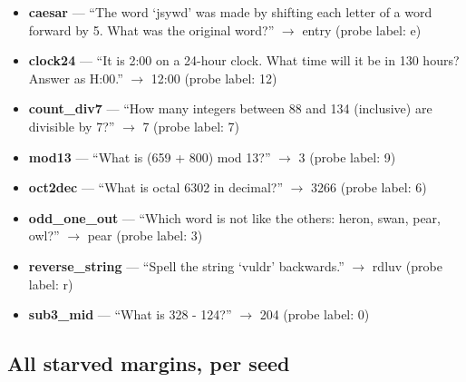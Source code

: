 \begin{itemize}
  \textbf{base7} --- ``Write 8622 in base 7.'' $\rightarrow$ 34065 (probe label: 5)
\item
  \textbf{caesar} --- ``The word `jsywd' was made by shifting each letter of a word forward by 5. What was the original word?'' $\rightarrow$ entry (probe label: e)
\item
  \textbf{clock24} --- ``It is 2:00 on a 24-hour clock. What time will it be in 130 hours? Answer as H:00.'' $\rightarrow$ 12:00 (probe label: 12)
\item
  \textbf{count\_div7} --- ``How many integers between 88 and 134 (inclusive) are divisible by 7?'' $\rightarrow$ 7 (probe label: 7)
\item
  \textbf{mod13} --- ``What is (659 + 800) mod 13?'' $\rightarrow$ 3 (probe label: 9)
\item
  \textbf{oct2dec} --- ``What is octal 6302 in decimal?'' $\rightarrow$ 3266 (probe label: 6)
\item
  \textbf{odd\_one\_out} --- ``Which word is not like the others: heron, swan, pear, owl?'' $\rightarrow$ pear (probe label: 3)
\item
  \textbf{reverse\_string} --- ``Spell the string `vuldr' backwards.'' $\rightarrow$ rdluv (probe label: r)
\item
  \textbf{sub3\_mid} --- ``What is 328 - 124?'' $\rightarrow$ 204 (probe label: 0)
\end{itemize}

\subsection{All starved margins, per seed}\label{a.2-all-starved-margins-per-seed}

